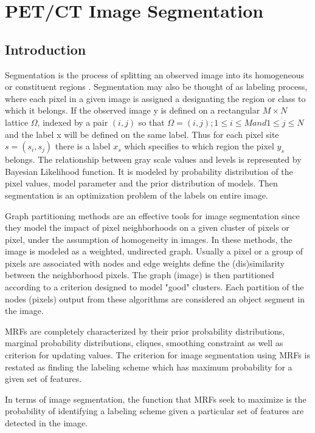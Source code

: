 \section{PET/CT Image Segmentation}

\subsection{Introduction}
Segmentation is the process of splitting an observed image into its homogeneous or constituent regions . Segmentation may also be thought of as labeling process, where each pixel in a given image is assigned a designating the region or class to which it belongs. If the observed image y is defined on a rectangular $M \times N$ lattice $\Omega$, indexed  by a pair $(i,j)$ so that \(\Omega = {(i,j); 1\leq i\leq M  and  1 \leq j \leq N}\) and the label x will be defined on the same label. Thus for each pixel site $s=(s_i,s_j)$ there is a label $x_s$ which specifies to which region the pixel $y_s$ belongs. The relationship between  gray scale values and levels is represented by Bayesian Likelihood function.  It is modeled by probability distribution of the pixel values, model parameter and the prior distribution of models. Then segmentation is an optimization problem  of the labels on entire image\cite{barker1998image}.

Graph partitioning methods are an effective tools for image segmentation since they model the impact of pixel neighborhoods on a given cluster of pixels or pixel, under the assumption of homogeneity in images. In these methods, the image is modeled as a weighted, undirected graph. Usually a pixel or a group of pixels are associated with nodes and edge weights define the (dis)similarity between the neighborhood pixels. The graph (image) is then partitioned according to a criterion designed to model "good" clusters. Each partition of the nodes (pixels) output from these algorithms are considered an object segment in the image.\par
MRFs are completely characterized by their prior probability distributions, marginal probability distributions, cliques, smoothing constraint as well as criterion for updating values. The criterion for image segmentation using MRFs is restated as finding the labeling scheme which has maximum probability for a given set of features. \par

In terms of image segmentation, the function that MRFs seek to maximize is the probability of identifying a labeling scheme given a particular set of features are detected in the image.

